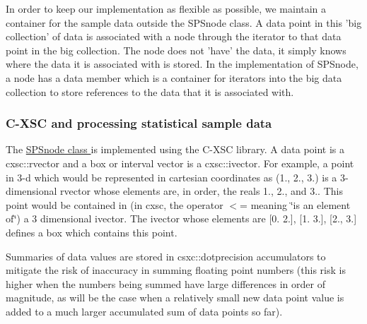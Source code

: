 \-In order to keep our implementation as flexible as possible, we maintain a container for the sample data outside the \-S\-P\-Snode class. \-A data point in this 'big collection' of data is associated with a node through the iterator to that data point in the big collection. \-The node does not 'have' the data, it simply knows where the data it is associated with is stored. \-In the implementation of \-S\-P\-Snode, a node has a data member which is a container for iterators into the big data collection to store references to the data that it is associated with.\hypertarget{StatsSubPavings_statssubsec_accumulating}{}\subsubsection{\-C-\/\-X\-S\-C and processing statistical sample data}\label{StatsSubPavings_statssubsec_accumulating}
\-The \hyperlink{classsubpavings_1_1SPSnode}{\-S\-P\-Snode class } is implemented using the \-C-\/\-X\-S\-C library. \-A data point is a cxsc\-::rvector and a box or interval vector is a cxsc\-::ivector. \-For example, a point in 3-\/d which would be represented in cartesian coordinates as (1., 2., 3.) is a 3-\/dimensional rvector whose elements are, in order, the reals 1., 2., and 3.. \-This point would be contained in (in cxsc, the operator $<$= meaning \char`\"{}is an element of\char`\"{}) a 3 dimensional ivector. \-The ivector whose elements are \mbox{[}0. 2.\mbox{]}, \mbox{[}1. 3.\mbox{]}, \mbox{[}2., 3.\mbox{]} defines a box which contains this point.

\-Summaries of data values are stored in csxc\-::dotprecision accumulators to mitigate the risk of inaccuracy in summing floating point numbers (this risk is higher when the numbers being summed have large differences in order of magnitude, as will be the case when a relatively small new data point value is added to a much larger accumulated sum of data points so far). 